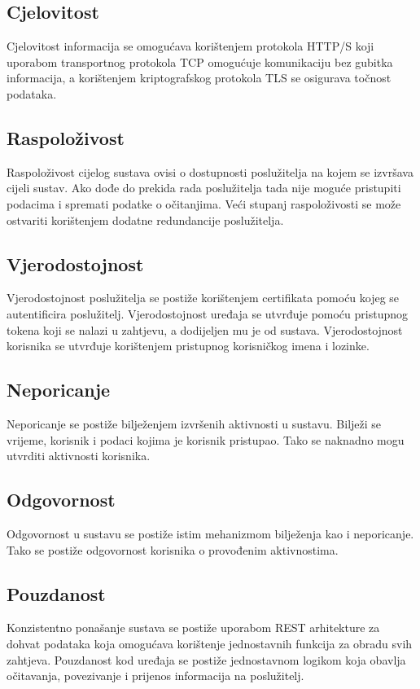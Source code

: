\documentclass[times, utf8, diplomski]{fer}
\begin{document}
\subsection{Cjelovitost}
Cjelovitost informacija se omogućava korištenjem protokola HTTP/S koji uporabom transportnog protokola TCP omogućuje komunikaciju bez gubitka informacija, a korištenjem kriptografskog protokola TLS se osigurava točnost podataka.

\subsection{Raspoloživost}
Raspoloživost cijelog sustava ovisi o dostupnosti poslužitelja na kojem se izvršava cijeli sustav. Ako dođe do prekida rada poslužitelja tada nije moguće pristupiti podacima i spremati podatke o očitanjima. Veći stupanj raspoloživosti se može ostvariti korištenjem dodatne redundancije poslužitelja.

\subsection{Vjerodostojnost}
Vjerodostojnost poslužitelja se postiže korištenjem certifikata pomoću kojeg se autentificira poslužitelj. Vjerodostojnost uređaja se utvrđuje pomoću pristupnog tokena koji se nalazi u zahtjevu, a dodijeljen mu je od sustava. Vjerodostojnost korisnika se utvrđuje korištenjem pristupnog korisničkog imena i lozinke.

\subsection{Neporicanje}
Neporicanje se postiže bilježenjem izvršenih aktivnosti u sustavu. Bilježi se vrijeme, korisnik i podaci kojima je korisnik pristupao. Tako se naknadno mogu utvrditi aktivnosti korisnika.

\subsection{Odgovornost}
Odgovornost u sustavu se postiže istim mehanizmom bilježenja kao i neporicanje. Tako se postiže odgovornost korisnika o provođenim aktivnostima.

\subsection{Pouzdanost}
Konzistentno ponašanje sustava se postiže uporabom REST arhitekture za dohvat podataka koja omogućava korištenje jednostavnih funkcija za obradu svih zahtjeva. Pouzdanost kod uređaja se postiže jednostavnom logikom koja obavlja očitavanja, povezivanje i prijenos informacija na poslužitelj.
\end{document}
